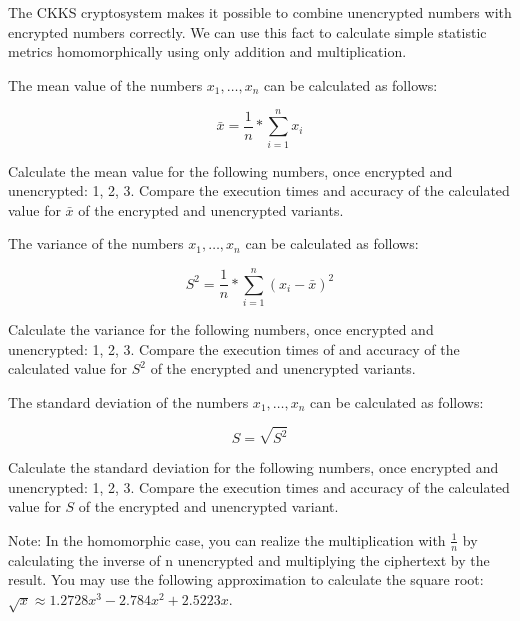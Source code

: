 \begin{aufgabe}
The CKKS cryptosystem makes it possible to combine unencrypted numbers with encrypted numbers correctly. We can use this fact to calculate simple statistic metrics homomorphically using only addition and multiplication. 

\begin{teilaufgabe}
\item The mean value of the numbers $x_1, \dots , x_n$ can be calculated as follows:

\begin{displaymath}
\bar{x} = \frac{1}{n} * \sum_{i=1}^n x_i
\end{displaymath}

Calculate the mean value for the following numbers, once encrypted and unencrypted: 1, 2, 3. 
Compare the execution times and accuracy of the calculated value for $\bar{x}$ of the encrypted and unencrypted variants.

\end{teilaufgabe}


\begin{teilaufgabe}
\item The variance of the numbers $x_1, \dots , x_n$ can be calculated as follows:

\begin{displaymath}
S^2 = \frac{1}{n} * \sum_{i=1}^n (x_i - \bar{x})^2
\end{displaymath}

Calculate the variance for the following numbers, once encrypted and unencrypted: 1, 2, 3. 
Compare the execution times of and accuracy of the calculated value for $S^2$ of the encrypted and unencrypted variants.

\end{teilaufgabe}


\begin{teilaufgabe}
\item The standard deviation of the numbers $x_1, \dots , x_n$ can be calculated as follows:

\begin{displaymath}
S = \sqrt{S^2}
\end{displaymath}

Calculate the standard deviation for the following numbers, once encrypted and unencrypted: 1, 2, 3. 
Compare the execution times and accuracy of the calculated value for $S$ of the encrypted and unencrypted variant. 

\end{teilaufgabe}

Note: In the homomorphic case, you can realize the multiplication with $\frac{1}{n}$ by calculating the inverse of n unencrypted and multiplying the ciphertext by the result. You may use the following approximation to calculate the square root: 
$\sqrt{x} \approx 1.2728x^3 - 2.784x^2 +2.5223 x$.

\end{aufgabe}
